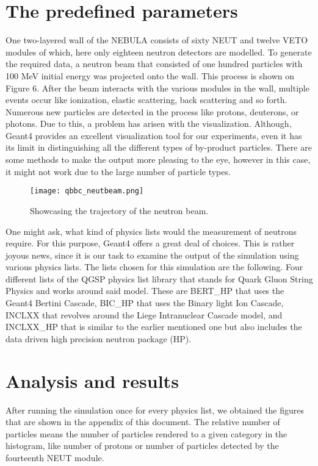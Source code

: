 \documentclass[12pt,twocolumn]{article}
\begin{document}
\section{The predefined parameters}

One two-layered wall of the NEBULA consists of sixty NEUT and twelve VETO modules of which, here only eighteen neutron detectors are modelled. \cite{nebula} To generate the required data, a neutron beam that consisted of one hundred particles with 100 MeV initial energy was projected onto the wall. This process is shown on Figure 6. After the beam interacts with the various modules in the wall, multiple events occur like ionization, elastic scattering, back scattering and so forth. Numerous new particles are detected in the process like protons, deuterons, or photons. Due to this, a problem has arisen with the visualization. Although, Geant4 provides an excellent visualization tool for our experiments, even it has its limit in distinguishing all the different types of by-product particles. There are some methods to make the output more pleasing to the eye, however in this case, it might not work due to the large number of particle types.

\begin{figure}[H]
    \centering
    \texttt{[image: qbbc\_neutbeam.png]}
    \caption{Showcasing the trajectory of the neutron beam.}
    \label{fig:my_label}
\end{figure}

One might ask, what kind of physics lists would the measurement of neutrons require. For this purpose, Geant4 offers a great deal of choices. \cite{geant} This is rather joyous news, since it is our task to examine the output of the simulation using various physics lists. The lists chosen for this simulation are the following. Four different lists of the QGSP physics list library that stands for Quark Gluon String Physics and works around said model. These are BERT\_HP that uses the Geant4 Bertini Cascade, BIC\_HP that uses the Binary light Ion Cascade, INCLXX that revolves around the Liege Intranuclear Cascade model, and INCLXX\_HP that is similar to the earlier mentioned one but also includes the data driven high precision neutron package (HP). \cite{geant}

\section{Analysis and results}
After running the simulation once for every physics list, we obtained the figures that are shown in the appendix of this document. The relative number of particles means the number of particles rendered to a given category in the histogram, like number of protons or number of particles detected by the fourteenth NEUT module.
\end{document}
